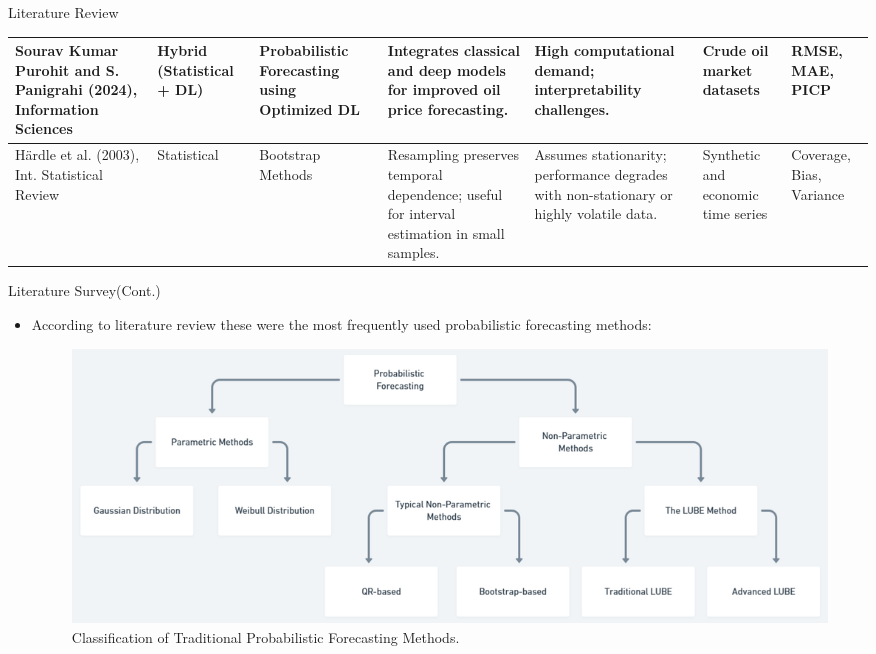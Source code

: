 \documentclass[xcolor=dvipsnames,aspectratio=169]{beamer}
\begin{document}
\begin{frame}{Literature Review}
\begin{table}[]
{\begin{tabular}{|p{2.0cm}|p{1.0cm}|p{1.5cm}|p{2.5cm}|p{2.5cm}|p{1.5cm}|p{1.0cm}|}
    Sourav Kumar Purohit and S. Panigrahi (2024), Information Sciences \cite{1} & Hybrid (Statistical + DL) & Probabilistic Forecasting using Optimized DL & Integrates classical and deep models for improved oil price forecasting. & High computational demand; interpretability challenges. & Crude oil market datasets & RMSE, MAE, PICP \\ \hline
    
    H{\"a}rdle et al. (2003), Int. Statistical Review \cite{Bootstrap} & Statistical & Bootstrap Methods & Resampling preserves temporal dependence; useful for interval estimation in small samples. & Assumes stationarity; performance degrades with non-stationary or highly volatile data. & Synthetic and economic time series & Coverage, Bias, Variance \\ \hline
    
    \end{tabular}
    }
    \label{tab:my_label}
\end{table}


\end{frame}

\begin{frame}{Literature Survey(Cont.)}
    \begin{itemize}
        \item According to literature review these were the most frequently used probabilistic forecasting methods:

        \begin{figure}
            \centering
            \includegraphics[width=0.8\linewidth]{Classification Of Probabilistic Methods.jpg}
            \caption{Classification of Traditional Probabilistic Forecasting Methods.}
            \label{fig:enter-label}
        \end{figure}
    \end{itemize}
    
\end{frame}
\end{document}
